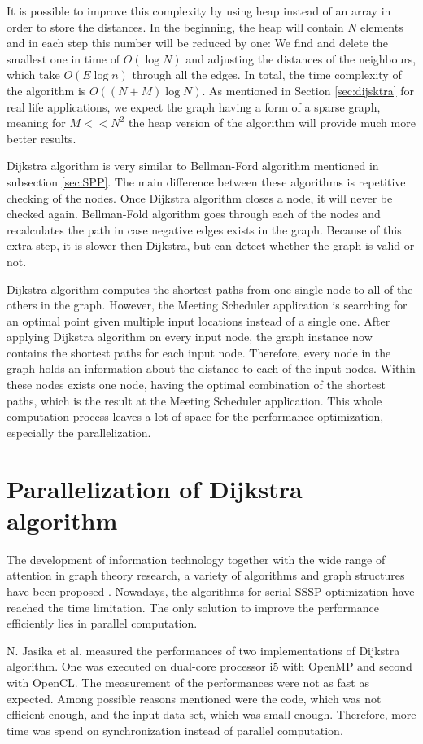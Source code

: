 \documentclass[thesis=M,english]{FITthesis}[2012/10/20]
\begin{document}
It is possible to improve this complexity by using heap instead of an array in order to store the distances. In the beginning, the heap will contain $N$ elements and in each step this number will be reduced by one: We find and delete the smallest one in time of $O(\log{N})$ and adjusting the distances of the neighbours, which take $O(E\log{n})$ through all the edges. In total, the time complexity of the algorithm is $O((N+M) \log{N})$. As mentioned in Section \ref{sec:dijsktra} for real life applications, we expect the graph having a form of a sparse graph, meaning for $M << N^2$ the heap version of the algorithm will provide much more better results.


Dijkstra algorithm is very similar to Bellman-Ford algorithm mentioned in subsection \ref{sec:SPP}. The main difference between these algorithms is repetitive checking of the nodes. Once Dijkstra algorithm closes a node, it will never be checked again. Bellman-Fold algorithm goes through each of the nodes and recalculates the path in case negative edges exists in the graph. Because of this extra step, it is slower then Dijkstra, but can detect whether the graph is valid or not.

Dijkstra algorithm computes the shortest paths from one single node to all of the others in the graph. However, the Meeting Scheduler application is searching for an optimal point given multiple input locations instead of a single one. After applying Dijkstra algorithm on every input node, the graph instance now contains the shortest paths for each input node. Therefore, every node in the graph holds an information about the distance to each of the input nodes. Within these nodes exists one node, having the optimal combination of the shortest paths, which is the result at the Meeting Scheduler application.
This whole computation process leaves a lot of space for the performance optimization, especially the parallelization. 
\newpage
\section{Parallelization of Dijkstra algorithm}
The development of information technology together with the wide range of attention in graph theory research, a variety of algorithms and graph structures have been proposed \cite{Peng09}. Nowadays, the algorithms for serial SSSP optimization have reached the time limitation. The only solution to improve the performance efficiently lies in parallel computation. 

N. Jasika et al.\cite{Jasika12} measured the performances of two implementations of Dijkstra algorithm. One was executed on dual-core processor i5 with OpenMP and second with OpenCL. The measurement of the performances were not as fast as expected. Among possible reasons mentioned were the code, which was not efficient enough, and the input data set, which was small enough. Therefore, more time was spend on synchronization instead of parallel computation.
\end{document}
